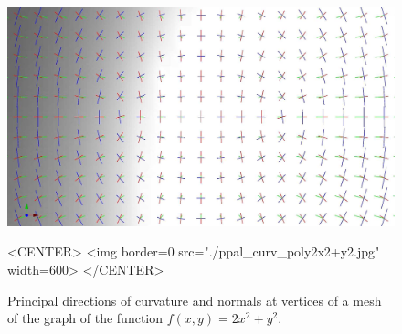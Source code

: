  

\begin{figure}[!ht]
\begin{ccTexOnly}
\centerline{
\includegraphics[width=.5\linewidth]{Jet_fitting_3/ppal_curv_poly2x2+y2}}
\end{ccTexOnly}
\caption{Principal directions of curvature and normals at vertices of a mesh of the
 graph of the function $f(x,y)=2x^2+y^2$.}

\begin{ccHtmlOnly}
<CENTER> <img border=0 src="./ppal_curv_poly2x2+y2.jpg" width=600>
</CENTER>
\end{ccHtmlOnly}
\label{fig:jet3:fig-elliptic-paraboloid}
\end{figure}


